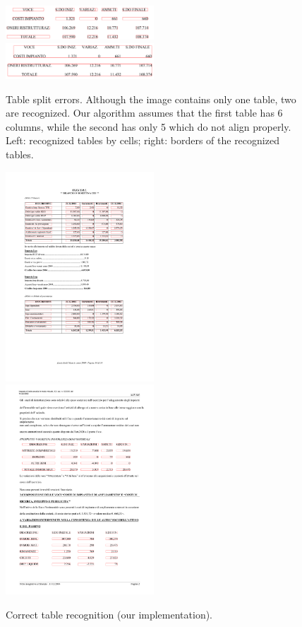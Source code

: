 \begin{figure}[t]
\centering
\includegraphics[width=15em]{img/results/otherErr1Cell.png}
\qquad
\includegraphics[width=15em]{img/results/otherErr1Table.png}
\caption{Table split errors. Although the image contains only one table, two are recognized. Our algorithm assumes that the first table has 6 columns, while the second has only 5 which do not align properly.
Left: recognized tables by cells; right: borders of the recognized tables.}
\label{fig:errorsOtherSplit}
\end{figure}

\begin{figure}[t]
\centering
\includegraphics[width=15em]{img/results/goodRes1.png}
\includegraphics[width=15em]{img/results/goodRes2.png}
\caption{Correct table recognition (our implementation).}
\label{fig:sampleResults}
\end{figure}